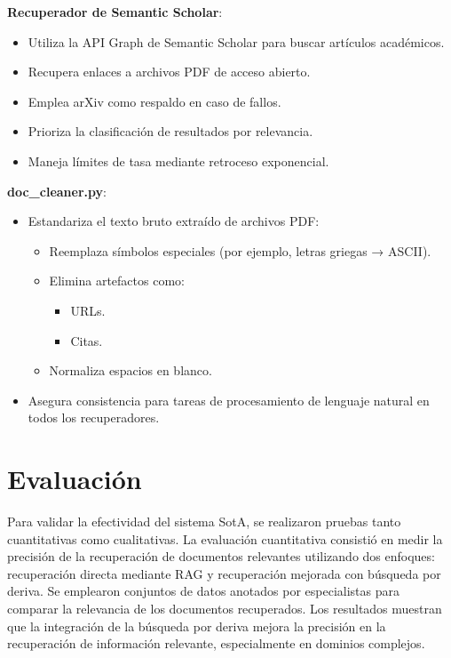 \documentclass[12pt]{article}
\begin{document}
    
\textbf{Recuperador de Semantic Scholar}:
\begin{itemize}
    \item Utiliza la API Graph de Semantic Scholar para buscar artículos académicos.
    \item Recupera enlaces a archivos PDF de acceso abierto.
    \item Emplea arXiv como respaldo en caso de fallos.
    \item Prioriza la clasificación de resultados por relevancia.
    \item Maneja límites de tasa mediante retroceso exponencial.
\end{itemize}

    
\textbf{doc\_cleaner.py}:
\begin{itemize}
    \item Estandariza el texto bruto extraído de archivos PDF:
        \begin{itemize}
            \item Reemplaza símbolos especiales (por ejemplo, letras griegas → ASCII).
            \item Elimina artefactos como:
                \begin{itemize}
                    \item URLs.
                    \item Citas.
                \end{itemize}
            \item Normaliza espacios en blanco.
        \end{itemize}
    \item Asegura consistencia para tareas de procesamiento de lenguaje natural en todos los recuperadores.
\end{itemize}

\section{Evaluación}

Para validar la efectividad del sistema SotA, se realizaron pruebas tanto cuantitativas como cualitativas. La evaluación cuantitativa consistió en medir la precisión de la recuperación de documentos relevantes utilizando dos enfoques: recuperación directa mediante RAG y recuperación mejorada con búsqueda por deriva. Se emplearon conjuntos de datos anotados por especialistas para comparar la relevancia de los documentos recuperados. Los resultados muestran que la integración de la búsqueda por deriva mejora la precisión en la recuperación de información relevante, especialmente en dominios complejos.
\end{document}
